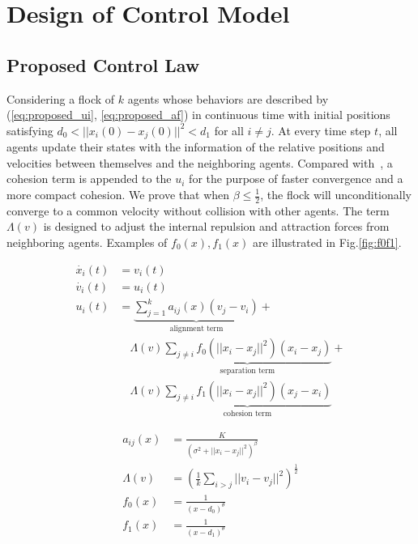 \chapter{Design of Control Model}\label{design}

\section{Proposed Control Law}\label{control_law}

Considering a flock of $k$ agents whose behaviors are described by (\ref{eq:proposed_ui}, \ref{eq:proposed_af}) in continuous time with initial positions satisfying $d_0<||x_i(0)-x_j(0)||^2<d_1$ for all $i\neq j$. At every time step $t$, all agents update their states with the information of the relative positions and velocities between themselves and the neighboring agents. Compared with~\cite{CuckerDong2010}, a cohesion term is appended to the $u_i$ for the purpose of faster convergence and a more compact cohesion. We prove that when $\beta\leq\frac{1}{2}$, the flock will unconditionally converge to a common velocity without collision with other agents. The term $\Lambda(v)$ is designed to adjust the internal repulsion and attraction forces from neighboring agents. Examples of $f_0(x), f_1(x)$ are illustrated in Fig.\ref{fig:f0f1}.

\begin{equation}\label{eq:proposed_ui}
\begin{aligned}
\dot{x_i}(t)&=v_i(t)\\
\dot{v_i}(t)&=u_i(t)\\
u_i(t)&=\underbrace{\sum^k_{j=1}a_{ij}(x)(v_j-v_i)}_{\text{alignment term}}+\\
&\quad\Lambda(v)\underbrace{\sum_{j\neq i}f_0(||x_i-x_j||^2)(x_i-x_j)}_{\text{separation term}}+\\
&\quad\Lambda(v)\underbrace{\sum_{j\neq i}f_1(||x_i-x_j||^2)(x_j-x_i)}_{\text{cohesion term}}
\end{aligned}
\end{equation}

\begin{equation}\label{eq:proposed_af}
\begin{aligned}
a_{ij}(x)&=\frac{K}{(\sigma^2+||x_i-x_j||^2)^{\beta}}\\
\Lambda(v)&=(\frac{1}{k}\sum_{i>j}||v_i-v_j||^2)^{\frac{1}{2}}\\
f_0(x)&=\frac{1}{(x-d_0)^{\theta}}\\
f_1(x)&=\frac{1}{(x-d_1)^{\theta}}
\end{aligned}
\end{equation}

